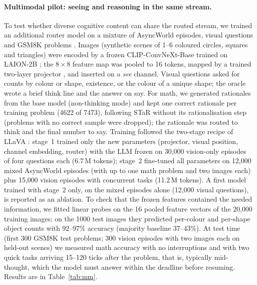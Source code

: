 \documentclass[10pt]{article}
\begin{document}
\paragraph{Multimodal pilot: seeing and reasoning in the same stream.} To test whether diverse cognitive content can share the routed stream, we trained an additional router model on a mixture of AsyncWorld episodes, visual questions and GSM8K problems \citep{cobbe2021gsm8k}. Images (synthetic scenes of 1--6 coloured circles, squares and triangles) were encoded by a frozen CLIP-ConvNeXt-Base \citep{liu2022convnext,radford2021clip} trained on LAION-2B \citep{schuhmann2022laion5b,cherti2023openclip}; the $8\times8$ feature map was pooled to 16 tokens, mapped by a trained two-layer projector \citep{liu2023llava}, and inserted on a \emph{see} channel. Visual questions asked for counts by colour or shape, existence, or the colour of a unique shape; the oracle wrote a brief think line and the answer on say. For math, we generated rationales from the base model (non-thinking mode) and kept one correct rationale per training problem (4622 of 7473), following STaR \citep{zelikman2022star} without its rationalisation step (problems with no correct sample were dropped); the rationale was routed to think and the final number to say. Training followed the two-stage recipe of LLaVA \citep{liu2023llava}: stage~1 trained only the new parameters (projector, visual position, channel embedding, router) with the LLM frozen on 30{,}000 vision-only episodes of four questions each (6.7\,M tokens); stage~2 fine-tuned all parameters on 12{,}000 mixed AsyncWorld episodes (with up to one math problem and two images each) plus 15{,}000 vision episodes with concurrent tasks (11.2\,M tokens). A first model trained with stage~2 only, on the mixed episodes alone (12{,}000 visual questions), is reported as an ablation. To check that the frozen features contained the needed information, we fitted linear probes on the 16 pooled feature vectors of the 20{,}000 training images; on the 1000 test images they predicted per-colour and per-shape object counts with 92--97\% accuracy (majority baseline 37--43\%). At test time (first 300 GSM8K test problems; 300 vision episodes with two images each on held-out scenes) we measured math accuracy with no interruptions and with two quick tasks arriving 15--120 ticks after the problem, that is, typically mid-thought, which the model must answer within the deadline before resuming. Results are in Table~\ref{tab:mm}.

\begin{table}[t]
\centering\small
\caption{Multimodal pilot (seed 0 of each model; per-seed results in Table~\ref{tab:mmseeds}). Accuracy in \%, bootstrap 95\% CI over items. Left: two-stage training (projector alignment, then full fine-tuning). Right: ablation trained without the alignment stage and with fewer visual examples.}
\label{tab:mm}
\resizebox{\linewidth}{!}{}
\end{table}
\end{document}
